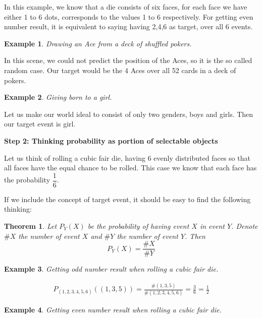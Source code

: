 \documentclass[12pt]{article}
\newtheorem*{theorem}{Theorem}
\newtheorem{example}{Example}
\begin{document}
    In this example, we know that a die consists of six faces, for each face we have either 1 to 6 dots, corresponds to the values 1 to 6 respectively. For getting even number result, it is equivalent to saying having 2,4,6 as target, over all 6 events.

    \begin{example}
        Drawing an Ace from a deck of shuffled pokers.
    \end{example}

    In this scene, we could not predict the position of the Aces, so it is the so called random case. Our target would be the 4 Aces over all 52 cards in a deck of pokers.

    \begin{example}
        Giving born to a girl.
    \end{example}

    Let us make our world ideal to consist of only two genders, boys and girls. Then our target event is girl.

    \begin{center}
        \textbf{Step 2: Thinking probability as portion of selectable objects}
    \end{center}

    Let us think of rolling a cubic fair die, having 6 evenly distributed faces so that all faces have the equal chance to be rolled. This case we know that each face has the probability $\dfrac{1}{6}$.
    
    If we include the concept of target event, it should be easy to find the following thinking:

    \begin{theorem}
        Let $P_Y(X)$ be the probability of having event $X$ in event $Y$. Denote $\#X$ the number of event $X$ and $\#Y$ the number of event $Y$. Then $$P_Y(X)=\frac{\#X}{\#Y}$$
    \end{theorem}

    \begin{example}
        Getting odd number result when rolling a cubic fair die.
    \end{example}

    \begin{align*}
        P_{(1,2,3,4,5,6)}((1,3,5))=\frac{\#(1,3,5)}{\#(1,2,3,4,5,6)}=\frac{3}{6}=\frac{1}{2}
    \end{align*}

    \begin{example}
        Getting even number result when rolling a cubic fair die.
    \end{example}
\end{document}
